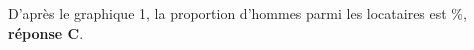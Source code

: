 %
%
%
%
%
D'après le graphique 1, la proportion d'hommes parmi les locataires est \%, \textbf{réponse C}.

